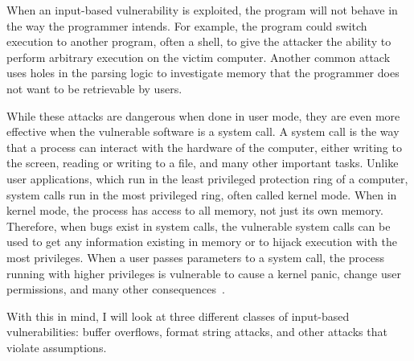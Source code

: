 When an input-based vulnerability is exploited, the program will not behave in the way the programmer intends.  For example, the program could switch execution to another program, often a shell, to give the attacker the ability to perform arbitrary execution on the victim computer.  Another common attack uses holes in the parsing logic to investigate memory that the programmer does not want to be retrievable by users.

While these attacks are dangerous when done in user mode, they are even more effective when the vulnerable software is a system call.  A system call is the way that a process can interact with the hardware of the computer, either writing to the screen, reading or writing to a file, and many other important tasks.  Unlike user applications, which run in the least privileged protection ring of a computer, system calls run in the most privileged ring, often called kernel mode.  When in kernel mode, the process has access to all memory, not just its own memory.  Therefore, when bugs exist in system calls, the vulnerable system calls can be used to get any information existing in memory or to hijack execution with the most privileges.  When a user passes parameters to a system call, the process running with higher privileges is vulnerable to cause a kernel panic, change user permissions, and many other consequences~\cite{johnson2004finding}.

With this in mind, I will look at three different classes of input-based vulnerabilities: buffer overflows, format string attacks, and other attacks that violate assumptions.

